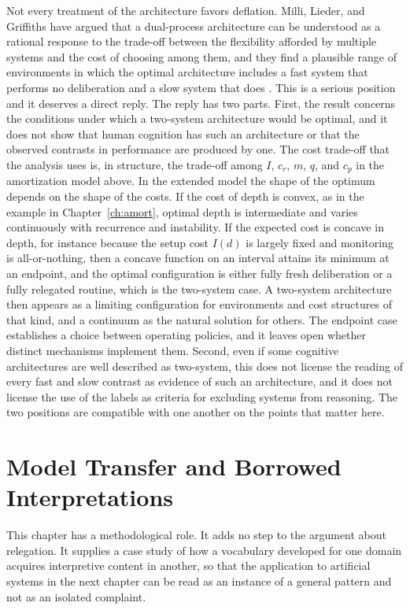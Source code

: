 \documentclass[11pt]{report}
\theoremstyle{remark}
\theoremstyle{definition}
\begin{document}
Not every treatment of the architecture favors deflation. Milli, Lieder, and Griffiths have argued that a dual-process architecture can be understood as a rational response to the trade-off between the flexibility afforded by multiple systems and the cost of choosing among them, and they find a plausible range of environments in which the optimal architecture includes a fast system that performs no deliberation and a slow system that does \cite{milli2021}. This is a serious position and it deserves a direct reply. The reply has two parts. First, the result concerns the conditions under which a two-system architecture would be optimal, and it does not show that human cognition has such an architecture or that the observed contrasts in performance are produced by one. The cost trade-off that the analysis uses is, in structure, the trade-off among $I$, $c_r$, $m$, $q$, and $c_p$ in the amortization model above. In the extended model the shape of the optimum depends on the shape of the costs. If the cost of depth is convex, as in the example in Chapter~\ref{ch:amort}, optimal depth is intermediate and varies continuously with recurrence and instability. If the expected cost is concave in depth, for instance because the setup cost $I(d)$ is largely fixed and monitoring is all-or-nothing, then a concave function on an interval attains its minimum at an endpoint, and the optimal configuration is either fully fresh deliberation or a fully relegated routine, which is the two-system case. A two-system architecture then appears as a limiting configuration for environments and cost structures of that kind, and a continuum as the natural solution for others. The endpoint case establishes a choice between operating policies, and it leaves open whether distinct mechanisms implement them. Second, even if some cognitive architectures are well described as two-system, this does not license the reading of every fast and slow contrast as evidence of such an architecture, and it does not license the use of the labels as criteria for excluding systems from reasoning. The two positions are compatible with one another on the points that matter here.

\chapter{Model Transfer and Borrowed Interpretations}\label{ch:transfer}

This chapter has a methodological role. It adds no step to the argument about relegation. It supplies a case study of how a vocabulary developed for one domain acquires interpretive content in another, so that the application to artificial systems in the next chapter can be read as an instance of a general pattern and not as an isolated complaint.
\end{document}
